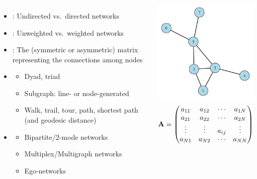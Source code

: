 \documentclass[8pt]{beamer}
\begin{document}

\begin{frame}
\frametitle{\insertsection}

\begin{columns}[c]
    \begin{itemize}
    \item {\color{blue}{Tie directionality}}: Undirected vs.\ directed networks
	\item {\color{blue}{Tie value}}: Unweighted vs.\ weighted networks
    \item {\color{blue}{Adjacency matrix}}: The (symmetric or asymmetric) matrix representing the connections among nodes 

    \item {\color{blue}{Definitions}}
    	\begin{itemize}  
    	\item Dyad, triad
    	\item Subgraph: line- or node-generated
    	\item Walk, trail, tour, path, shortest path (and geodesic distance)
    	\end{itemize}

    \item {\color{blue}{Types of networks}}
    	\begin{itemize}
    	\item Bipartite/2-mode networks
    	\item Multiplex/Multigraph networks
    	\item Ego-networks
   	 	\end{itemize}
	\end{itemize}

\centering
\includegraphics[width=5cm]{base}
\[\mathbf{A} =\left(\begin{array}{@{}cccc@{}}
             a_{11}&a_{12}&\cdots &a_{1N} \\
             a_{21}&a_{22}&\cdots &a_{2N} \\
             \vdots & \vdots & a_{ij} & \vdots\\
             a_{N1}&a_{N2}&\cdots &a_{NN}
             \end{array}\right)\]

\end{columns}

\end{frame}
\end{document}
